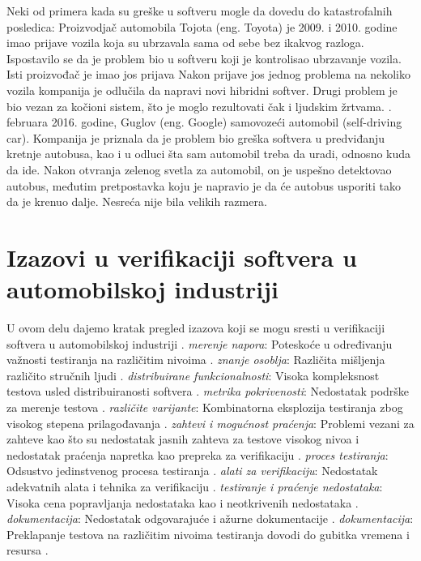 \documentclass{article}
\begin{document}
\bigbreak
Neki od primera kada su greške u softveru mogle da dovedu do katastrofalnih posledica:
\bigbreak
Proizvodjač automobila Tojota (eng. Toyota) je 2009. i 2010. godine imao prijave vozila koja su ubrzavala sama od sebe bez ikakvog razloga. Ispostavilo se da je problem bio u softveru koji je kontrolisao ubrzavanje vozila. Isti proizvođač je imao jos prijava Nakon prijave jos jednog problema na nekoliko vozila kompanija je odlučila da napravi novi hibridni softver. Drugi problem je bio vezan za kočioni sistem, što je moglo rezultovati čak i ljudskim žrtvama. 
. februara 2016. godine, Guglov (eng. Google) samovozeći automobil (self-driving car). Kompanija je priznala da je problem bio greška softvera u predviđanju kretnje autobusa, kao i u odluci šta sam automobil treba da uradi, odnosno kuda da ide. Nakon otvranja zelenog svetla za automobil, on je uspešno detektovao autobus, međutim pretpostavka koju je napravio je da će autobus usporiti tako da je krenuo dalje. Nesreća nije bila velikih razmera.

\section{Izazovi u verifikaciji softvera u automobilskoj industriji}

U ovom delu dajemo kratak pregled izazova koji se mogu sresti u verifikaciji softvera u automobilskoj industriji \cite{knjiga1}\cite{knjiga2}\cite{knjiga3}.
\bigbreak
\textit{merenje napora}: Poteskoće u određivanju važnosti testiranja na različitim nivoima \cite{knjiga2}.
\bigbreak
\textit{znanje osoblja}: Različita mišljenja različito stručnih ljudi \cite{knjiga2}.
\bigbreak
\textit{distribuirane funkcionalnosti}: Visoka kompleksnost testova usled distribuiranosti softvera \cite{knjiga2}.
\bigbreak
\textit{metrika pokrivenosti}: Nedostatak podrške za merenje testova \cite{knjiga2}. 
\bigbreak
\textit{različite varijante}: Kombinatorna eksplozija testiranja zbog visokog stepena prilagođavanja \cite{knjiga2}.
\bigbreak
\textit{zahtevi i mogućnost praćenja}: Problemi vezani za zahteve kao što su nedostatak jasnih zahteva za testove visokog nivoa i nedostatak praćenja napretka kao prepreka za verifikaciju \cite{knjiga1}.
\bigbreak
\textit{proces testiranja}: Odsustvo jedinstvenog procesa testiranja \cite{knjiga1}.
\bigbreak
\textit{alati za verifikaciju}: Nedostatak adekvatnih alata i tehnika za verifikaciju \cite{knjiga1}.
\bigbreak
\textit{testiranje i praćenje nedostataka}: Visoka cena popravljanja nedostataka kao i neotkrivenih nedostataka \cite{knjiga1}.
\bigbreak
\textit{dokumentacija}: Nedostatak odgovarajuće i ažurne dokumentacije \cite{knjiga1}.
\bigbreak
\textit{dokumentacija}: Preklapanje testova na različitim nivoima testiranja dovodi do gubitka vremena i resursa \cite{knjiga3}.
\end{document}
